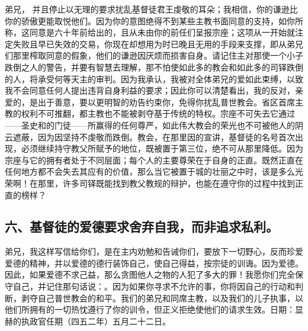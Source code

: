  弟兄，  并且停止以无理的要求扰乱基督徒君王虔敬的耳朵；我相信，你的谦逊比你的骄傲更能取悦他们。因为你的意图绝得不到某些主教书面同意的支持，如你所称，这同意是六十年前给出的，且从未由你的前任们呈报宗座；这项从一开始就注定失败且早已失效的交易，你现在却想用为时已晚且无用的手段来支撑，即从弟兄们那里榨取同意的假象，他们的谦逊因厌烦而损害自身。请记住主对那使一个小子跌倒之人的警告，并要有智慧去理解，那不怕使如此多的教会和如此多的司铎跌倒的人，将承受何等天主的审判。因为我承认，我被对全体弟兄的爱如此束缚，以致我不会同意任何人提出违背自身利益的要求；因此你可以清楚看出，我的反对，亲爱的，是出于善意，要以更明智的劝告约束你，免得你扰乱普世教会。省区首席主教的权利不可推翻，都主教也不能被剥夺基于传统的特权。宗座不可失去它通过——圣史和的门徒——所赢得的任何尊严，如此伟大教会的荣光也不可被他人的阴云遮蔽，因为因坚持不虔敬而跌倒。教会，在那里因的宣讲，基督徒的名号首次出现，必须继续持守教父所赋予的地位，既被置于第三位，绝不可从那里降低。因为宗座与它的拥有者处于不同层面；每个人的主要尊荣在于自身的正直。既然正直在任何地方都不会失去其应有的价值，那么当它被置于城的壮丽之中时，该是多么光荣啊！在那里，许多司铎既能找到教父教规的辩护，也能在遵守你的过程中找到正直的榜样？\par


\subsection{六、基督徒的爱德要求舍弃自我，而非追求私利。}

弟兄，我这样写信给你们，是在主内劝勉和告诫你们，要放下一切野心，反而珍爱爱德的精神，并以爱德的德行装饰自己，使自己得益，按宗徒的训诲。因为爱德。因此，如果爱德不求己益，那么贪图他人之物的人犯了多大的罪！我愿你们完全保守自己，并记住那句话说：。因为如果你寻求不允许的事，你将因自己的行动和判断，剥夺自己普世教会的和平。我们的弟兄和同席主教，以及我们的儿子执事，以他们所拥有的一切热忱遵行了你的训令，但正义拒绝使他们的请求生效。日期：显赫的执政官任期（四五二年）五月二十二日。\par



